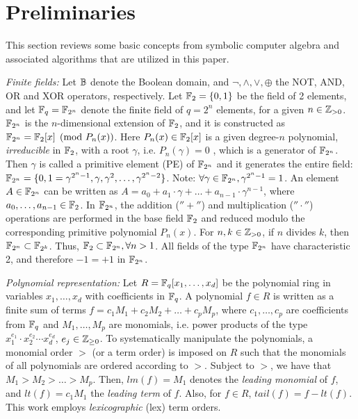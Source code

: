\section{Preliminaries}
\label{sec:prelim}
This section reviews some basic concepts from symbolic computer
algebra and associated algorithms that are utilized in this paper. 

{\it Finite fields:} Let ${\mathbb{B}}$ denote the Boolean domain, and $\neg,
\wedge,\vee, \oplus$ the NOT, AND, OR and XOR operators,
respectively. Let ${\mathbb{F}}_2=\{0,1\}$ be the field of 2 elements, and let
${\mathbb{F}}_q = {\mathbb{F}}_{2^n}$ denote the finite field of $q=2^n$ elements, for a
given $n\in {\mathbb{Z}}_{> 0}$. ${\mathbb{F}}_{2^n}$ is the $n$-dimensional extension of
${\mathbb{F}}_2$, and it is constructed as ${\mathbb{F}}_{2^n} = {\mathbb{F}}_2[x]\pmod{ P_n(x)}$. Here
$P_n(x) \in {\mathbb{F}}_2[x]$ is a given degree-$n$ polynomial, {\it
  irreducible} in ${\mathbb{F}}_2$, with a root $\gamma$, i.e.  $P_n(\gamma)=0$ 
{\red , which is a generator of
${\mathbb{F}}_{2^n}$. Then $\gamma$ is called a primitive element (PE) of ${\mathbb{F}}_{2^n}$ and
it generates the entire field: ${\mathbb{F}}_{2^n}=\{0,1=\gamma^{2^n - 1}, \gamma,
\gamma^2,\dots,\gamma^{2^n - 2}\}$. Note: $\forall \gamma\in {\mathbb{F}}_{2^n}, 
\gamma^{2^n-1}=1$.
An element $A \in {\mathbb{F}}_{2^n}$ can be written as $A = a_0 + a_1\cdot \gamma +
\dots + a_{n-1}\cdot\gamma^{n-1}$, where $a_0,\dots,a_{n-1} \in
{\mathbb{F}}_2$. 
In ${\mathbb{F}}_{2^n}$, the addition ($''+''$) and multiplication
($''\cdot''$) operations are performed in the base field ${\mathbb{F}}_2$ and
reduced modulo the corresponding primitive polynomial $P_n(x)$. For
$n, k \in {\mathbb{Z}}_{> 0}$, if $n$ divides $k$, then ${\mathbb{F}}_{2^n} \subset
{\mathbb{F}}_{2^k}$.}
Thus, ${\mathbb{F}}_2 \subset {\mathbb{F}}_{2^n}, \forall n>1$. 
All fields of the type
${\mathbb{F}}_{2^n}$ have characteristic 2, and therefore $-1 = +1$ in ${\mathbb{F}}_{2^n}$. 


{\it Polynomial representation:} Let $R={\mathbb{F}}_q[x_1,\dots,x_d]$ be the
polynomial ring in variables $x_1,\dots,x_d$ with coefficients in
${\mathbb{F}}_q$. A polynomial $f \in R$ is 
written as a finite sum of terms  $f = c_1 M_1 +  c_2 M_2 + \dots +
c_p M_p$, where $c_1, \dots, c_p$ are coefficients from ${\mathbb{F}}_q$ and
$M_1, \dots, M_p$ are monomials, i.e. power products of the type
$x_1^{e_{1}}\cdot x_2^{e_{2}}\cdots x_d^{e_{d}}$,  $e_j \in {\mathbb{Z}}_{\geq  0}$. 
{\red To systematically manipulate the polynomials, a monomial order $>$ (or
a term order) is imposed on $R$ such that the monomials of all
polynomials are ordered according to $>$. }
Subject to $>$, we have that $M_1 >M_2 > \dots > M_p$. Then, $lm(f) =
M_1$ denotes the {\it leading monomial} of $f$, and $lt(f) = c_1 M_1$
the  {\it leading   term} of $f$. 
{\red Also, for $f\in R$, $tail(f) = f - lt(f)$.
This work employs {\it lexicographic} (lex) term orders.}  

